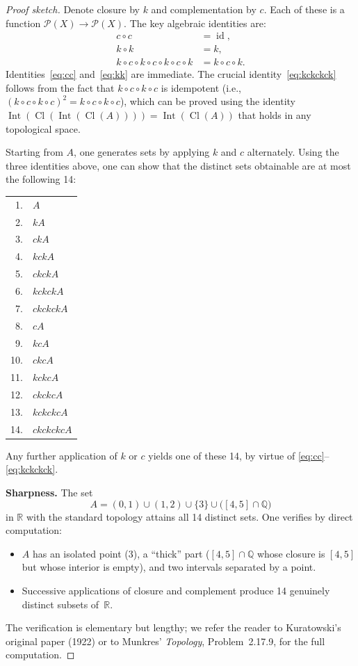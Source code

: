 \documentclass[11pt,a4paper,twoside]{book}
\theoremstyle{remark}
\theoremstyle{definition}
\theoremstyle{definition}
\newcommand{\Pow}{\mathcal{P}}           %
\newcommand{\R}{\mathbb{R}}
\newcommand{\Q}{\mathbb{Q}}
\DeclareMathOperator{\Int}{Int}
\DeclareMathOperator{\Cl}{Cl}
\begin{document}
\begin{proof}[Proof sketch]
Denote closure by $k$ and complementation by $c$.  Each of these is a function
$\Pow(X)\to\Pow(X)$.  The key algebraic identities are:
\begin{align}
  c\circ c &= \operatorname{id}, \label{eq:cc}\\
  k\circ k &= k, \label{eq:kk}\\
  k\circ c\circ k\circ c\circ k\circ c\circ k
  &= k\circ c\circ k. \label{eq:kckckck}
\end{align}
Identities~\eqref{eq:cc} and~\eqref{eq:kk} are immediate.  The crucial
identity~\eqref{eq:kckckck} follows from the fact that
$k\circ c\circ k\circ c$ is idempotent (i.e.,
$(k\circ c\circ k\circ c)^2 = k\circ c\circ k\circ c$), which can be proved
using the identity $\Int(\Cl(\Int(\Cl(A))))=\Int(\Cl(A))$ that holds in any
topological space.

Starting from $A$, one generates sets by applying $k$ and $c$ alternately.
Using the three identities above, one can show that the distinct sets obtainable are
at most the following 14:
\begin{center}
\begin{tabular}{rl}
  1. & $A$ \\
  2. & $kA$ \\
  3. & $ckA$ \\
  4. & $kckA$ \\
  5. & $ckckA$ \\
  6. & $kckckA$ \\
  7. & $ckckckA$ \\
  8. & $cA$ \\
  9. & $kcA$ \\
  10. & $ckcA$ \\
  11. & $kckcA$ \\
  12. & $ckckcA$ \\
  13. & $kckckcA$ \\
  14. & $ckckckcA$ \\
\end{tabular}
\end{center}
Any further application of $k$ or $c$ yields one of these 14, by virtue of
\eqref{eq:cc}--\eqref{eq:kckckck}.

\textbf{Sharpness.}  The set
\[
  A = (0,1)\cup(1,2)\cup\{3\}\cup\bigl([4,5]\cap\Q\bigr)
\]
in $\R$ with the standard topology attains all 14 distinct sets.  One verifies
by direct computation:
\begin{itemize}
  \item $A$ has an isolated point ($3$), a ``thick'' part ($[4,5]\cap\Q$ whose
        closure is $[4,5]$ but whose interior is empty), and two intervals
        separated by a point.
  \item Successive applications of closure and complement produce 14 genuinely
        distinct subsets of~$\R$.
\end{itemize}
The verification is elementary but lengthy; we refer the reader to Kuratowski's
original paper (1922) or to Munkres' \emph{Topology}, Problem~2.17.9, for the
full computation.
\end{proof}
\end{document}
